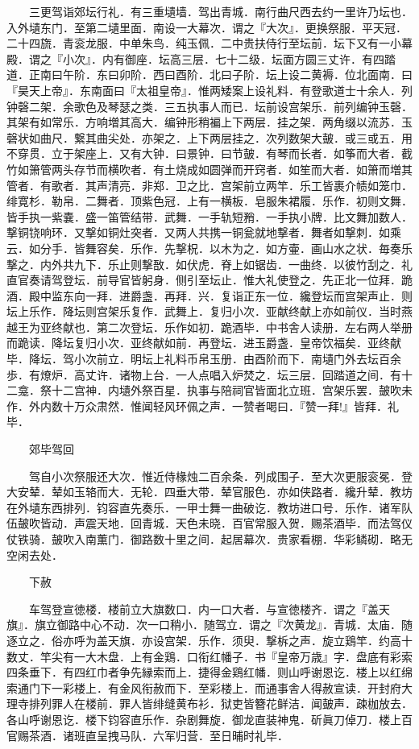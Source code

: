 　　三更驾诣郊坛行礼．有三重壝墙．驾出青城．南行曲尺西去约一里许乃坛也．入外壝东门．至第二壝里面．南设一大幕次．谓之『大次』．更换祭服．平天冠．二十四旒．青衮龙服．中单朱鸟．纯玉佩．二中贵扶侍行至坛前．坛下又有一小幕殿．谓之『小次』．内有御座．坛高三层．七十二级．坛面方圆三丈许．有四踏道．正南曰午阶．东曰卯阶．西曰酉阶．北曰子阶．坛上设二黄褥．位北面南．曰『昊天上帝』．东南面曰『太祖皇帝』．惟两矮案上设礼料．有登歌道士十余人．列钟磬二架．余歌色及琴瑟之类．三五执事人而已．坛前设宫架乐．前列编钟玉磬．其架有如常乐．方响増其高大．编钟形稍褊上下两层．挂之架．两角缀以流苏．玉磬状如曲尺．繋其曲尖处．亦架之．上下两层挂之．次列数架大皷．或三或五．用不穿贯．立于架座上．又有大钟．曰景钟．曰节皷．有琴而长者．如筝而大者．截竹如箫管两头存节而横吹者．有土烧成如圆弹而开窍者．如笙而大者．如箫而増其管者．有歌者．其声清亮．非郑．卫之比．宫架前立两竿．乐工皆裹介帻如笼巾．绯寛杉．勒帛．二舞者．顶紫色冠．上有一横板．皂服朱裙履．乐作．初则文舞．皆手执一紫嚢．盛一笛管结带．武舞．一手轨短矟．一手执小牌．比文舞加数人．撃铜铙响环．又撃如铜灶突者．又两人共携一铜瓮就地撃者．舞者如撃刺．如乘云．如分手．皆舞容矣．乐作．先撃柷．以木为之．如方壷．画山水之状．毎奏乐撃之．内外共九下．乐止则撃敔．如伏虎．脊上如锯齿．一曲终．以彼竹刮之．礼直官奏请驾登坛．前导官皆躬身．侧引至坛止．惟大礼使登之．先正北一位拜．跪酒．殿中监东向一拜．进爵盏．再拜．兴．复诣正东一位．纔登坛而宫架声止．则坛上乐作．降坛则宫架乐复作．武舞上．复归小次．亚献终献上亦如前仪．当时燕越王为亚终献也．第二次登坛．乐作如初．跪酒毕．中书舎人读册．左右两人举册而跪读．降坛复归小次．亚终献如前．再登坛．进玉爵盏．皇帝饮福矣．亚终献毕．降坛．驾小次前立．明坛上礼料币帛玉册．由酉阶而下．南壝门外去坛百余歩．有燎炉．高丈许．诸物上台．一人点唱入炉焚之．坛三层．回踏道之间．有十二龛．祭十二宫神．内壝外祭百星．执事与陪祠官皆面北立班．宫架乐罢．皷吹未作．外内数十万众肃然．惟闻轻风环佩之声．一赞者喝曰．『赞一拜!』皆拜．礼毕．

　　郊毕驾回

　　驾自小次祭服还大次．惟近侍椽烛二百余条．列成围子．至大次更服衮冕．登大安辇．辇如玉辂而大．无轮．四垂大带．辇官服色．亦如侠路者．纔升辇．教坊在外壝东西排列．钧容直先奏乐．一甲士舞一曲破讫．教坊进口号．乐作．诸军队伍皷吹皆动．声震天地．回青城．天色未晓．百官常服入贺．赐茶酒毕．而法驾仪仗铁骑．皷吹入南薫门．御路数十里之间．起居幕次．贵家看棚．华彩鳞砌．略无空闲去处．

　　下赦

　　车驾登宣徳楼．楼前立大旗数口．内一口大者．与宣徳楼齐．谓之『盖天旗』．旗立御路中心不动．次一口稍小．随驾立．谓之『次黄龙』．青城．太庙．随逐立之．俗亦呼为盖天旗．亦设宫架．乐作．须臾．撃柝之声．旋立鶏竿．约高十数丈．竿尖有一大木盘．上有金鶏．口衔红幡子．书『皇帝万歳』字．盘底有彩索四条垂下．有四红巾者争先縁索而上．捷得金鶏红幡．则山呼谢恩讫．楼上以红绵索通门下一彩楼上．有金风衔赦而下．至彩楼上．而通事舎人得赦宣读．开封府大理寺排列罪人在楼前．罪人皆绯缝黄布衫．狱吏皆簪花鲜洁．闻皷声．疎枷放去．各山呼谢恩讫．楼下钧容直乐作．杂剧舞旋．御龙直装神鬼．斫眞刀倬刀．楼上百官赐茶酒．诸班直呈拽马队．六军归营．至日晡时礼毕．

